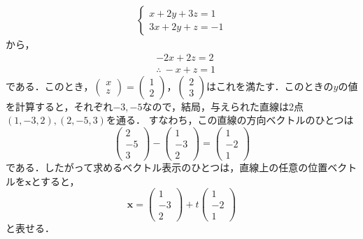 \begin{tanswer}
  \begin{align*}
    \begin{cases}
      x+2y+3z=1 \\
      3x+2y+z=-1
    \end{cases}
  \end{align*}
  から，
  \begin{align*}
     & -2x+2z=2            \\
     & \therefore ~ -x+z=1
  \end{align*}
  である．このとき，$
    \begin{pmatrix}
      x \\
      z
    \end{pmatrix}
    =
    \begin{pmatrix}
      1 \\
      2
    \end{pmatrix}
    ，
    \begin{pmatrix}
      2 \\
      3
    \end{pmatrix}
  $はこれを満たす．このときの$y$の値を計算すると，それぞれ$-3,-5$なので，結局，与えられた直線は2点$(1,-3,2),(2,-5,3)$を通る．
  すなわち，この直線の方向ベクトルのひとつは
  \[
    \begin{pmatrix}
      2  \\
      -5 \\
      3
    \end{pmatrix}
    -
    \begin{pmatrix}
      1  \\
      -3 \\
      2
    \end{pmatrix}
    =
    \begin{pmatrix}
      1  \\
      -2 \\
      1
    \end{pmatrix}
  \]
  である．したがって求めるベクトル表示のひとつは，直線上の任意の位置ベクトルを$\bm{x}$とすると，
  \[
    \bm{x} =
    \begin{pmatrix}
      1  \\
      -3 \\
      2
    \end{pmatrix}
    +t
    \begin{pmatrix}
      1  \\
      -2 \\
      1
    \end{pmatrix}
  \]
  と表せる．
\end{tanswer}

